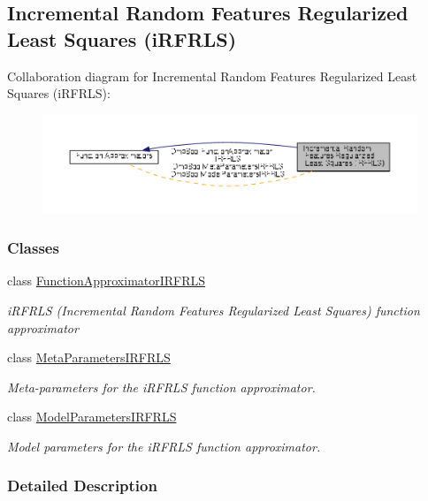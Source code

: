 \hypertarget{group__IRFRLS}{\subsection{Incremental Random Features Regularized Least Squares (i\+R\+F\+R\+L\+S)}
\label{group__IRFRLS}
}
Collaboration diagram for Incremental Random Features Regularized Least Squares (i\+R\+F\+R\+L\+S)\+:
\nopagebreak
\begin{figure}[H]
\begin{center}
\leavevmode
\includegraphics[width=350pt]{group__IRFRLS}
\end{center}
\end{figure}
\subsubsection*{Classes}
\begin{DoxyCompactItemize}
\item 
class \hyperlink{classDmpBbo_1_1FunctionApproximatorIRFRLS}{Function\+Approximator\+I\+R\+F\+R\+L\+S}
\begin{DoxyCompactList}\small\item\em i\+R\+F\+R\+L\+S (Incremental Random Features Regularized Least Squares) function approximator \end{DoxyCompactList}\item 
class \hyperlink{classDmpBbo_1_1MetaParametersIRFRLS}{Meta\+Parameters\+I\+R\+F\+R\+L\+S}
\begin{DoxyCompactList}\small\item\em Meta-\/parameters for the i\+R\+F\+R\+L\+S function approximator. \end{DoxyCompactList}\item 
class \hyperlink{classDmpBbo_1_1ModelParametersIRFRLS}{Model\+Parameters\+I\+R\+F\+R\+L\+S}
\begin{DoxyCompactList}\small\item\em Model parameters for the i\+R\+F\+R\+L\+S function approximator. \end{DoxyCompactList}\end{DoxyCompactItemize}


\subsubsection{Detailed Description}
